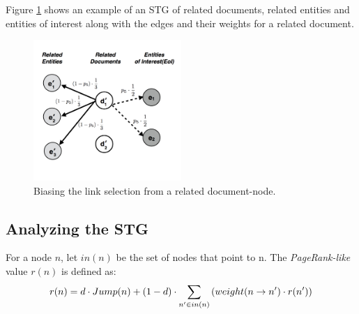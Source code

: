 \documentclass{article}
\begin{document}
Figure \ref{fig:document_weighting} shows an example of an STG of
related documents, related entities and entities of interest along with the
edges and their weights for a related document.

\begin{figure}[ht]
\begin{mdframed}
	\centering
	\includegraphics[width=0.5\textwidth]{document_weighting}
\end{mdframed}
	\caption{Biasing the link selection from a related document-node.}
	\label{fig:document_weighting}
\end{figure}


\subsection{Analyzing the STG}
For a node $n$, let $in(n)$ be the set of nodes that point to n. 
The {\em PageRank-like} value $r(n)$ is defined as:
\begin{equation}
\begin{split}
\small
r(n) = d \cdot Jump(n) + (1-d) \cdot \sum_{n' \in in(n)}{(weight(n \rightarrow n') \cdot r(n'))}  
\end{split}
\end{equation}



\end{document}
